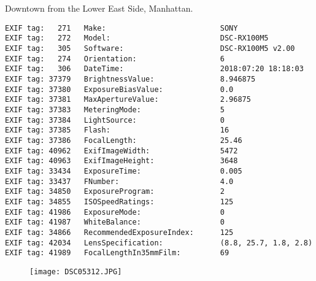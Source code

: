 
\clearpage
\section{\protect{}}
\noindent Downtown from the Lower East Side, Manhattan.
\noindent
\begin{lstlisting}
EXIF tag:   271   Make:                          SONY
EXIF tag:   272   Model:                         DSC-RX100M5
EXIF tag:   305   Software:                      DSC-RX100M5 v2.00
EXIF tag:   274   Orientation:                   6
EXIF tag:   306   DateTime:                      2018:07:20 18:18:03
EXIF tag: 37379   BrightnessValue:               8.946875
EXIF tag: 37380   ExposureBiasValue:             0.0
EXIF tag: 37381   MaxApertureValue:              2.96875
EXIF tag: 37383   MeteringMode:                  5
EXIF tag: 37384   LightSource:                   0
EXIF tag: 37385   Flash:                         16
EXIF tag: 37386   FocalLength:                   25.46
EXIF tag: 40962   ExifImageWidth:                5472
EXIF tag: 40963   ExifImageHeight:               3648
EXIF tag: 33434   ExposureTime:                  0.005
EXIF tag: 33437   FNumber:                       4.0
EXIF tag: 34850   ExposureProgram:               2
EXIF tag: 34855   ISOSpeedRatings:               125
EXIF tag: 41986   ExposureMode:                  0
EXIF tag: 41987   WhiteBalance:                  0
EXIF tag: 34866   RecommendedExposureIndex:      125
EXIF tag: 42034   LensSpecification:             (8.8, 25.7, 1.8, 2.8)
EXIF tag: 41989   FocalLengthIn35mmFilm:         69

\end{lstlisting}
\clearpage
\begin{figure}
\raggedleft
\texttt{[image: DSC05312.JPG]}
\end{figure}


\clearpage
